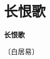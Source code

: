 \documentclass[12pt,UTF-8,openany,fontset=none]{ctexbook}
\begin{document}
\section{长恨歌}


\begin{center}
    {\bfseries 长恨歌}

    \vspace{18pt}

    \begin{large}\xuwen
        〔白居易〕
    \end{large}

\end{center}

    \vspace{18pt}  %
\end{document}
